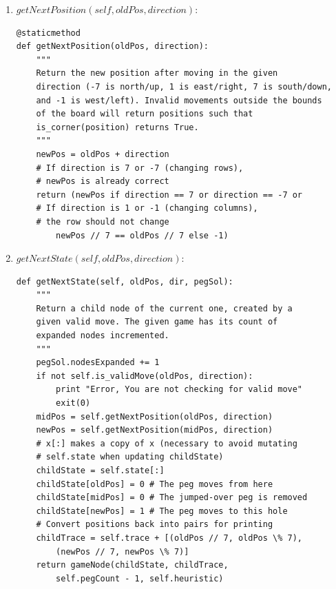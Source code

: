 \documentclass[11pt, letter]{article}
\begin{document}
\begin{enumerate}
\item \(getNextPosition(self, oldPos, direction)\):

\begin{lstlisting}[frame=single]
@staticmethod
def getNextPosition(oldPos, direction):
	"""
	Return the new position after moving in the given
	direction (-7 is north/up, 1 is east/right, 7 is south/down,
	and -1 is west/left). Invalid movements outside the bounds
	of the board will return positions such that
	is_corner(position) returns True.
	"""
	newPos = oldPos + direction
	# If direction is 7 or -7 (changing rows),
	# newPos is already correct
	return (newPos if direction == 7 or direction == -7 or
	# If direction is 1 or -1 (changing columns),
	# the row should not change
		newPos // 7 == oldPos // 7 else -1)
\end{lstlisting}

\item \(getNextState(self, oldPos, direction)\):

\begin{lstlisting}[frame=single]
def getNextState(self, oldPos, dir, pegSol):
	"""
	Return a child node of the current one, created by a
	given valid move. The given game has its count of
	expanded nodes incremented.
	"""
	pegSol.nodesExpanded += 1
	if not self.is_validMove(oldPos, direction):
		print "Error, You are not checking for valid move"
		exit(0)
	midPos = self.getNextPosition(oldPos, direction)
	newPos = self.getNextPosition(midPos, direction)
	# x[:] makes a copy of x (necessary to avoid mutating
	# self.state when updating childState)
	childState = self.state[:]
	childState[oldPos] = 0 # The peg moves from here
	childState[midPos] = 0 # The jumped-over peg is removed
	childState[newPos] = 1 # The peg moves to this hole
	# Convert positions back into pairs for printing
	childTrace = self.trace + [(oldPos // 7, oldPos \% 7),
		(newPos // 7, newPos \% 7)]
	return gameNode(childState, childTrace,
		self.pegCount - 1, self.heuristic)
\end{lstlisting}

\end{enumerate}
\end{document}
